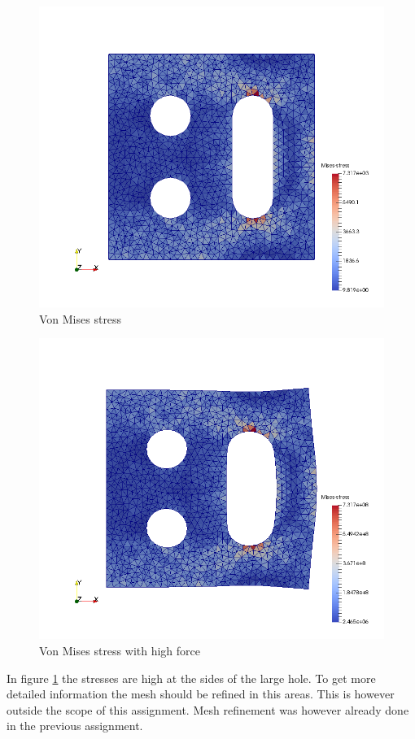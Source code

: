 \begin{figure}[H]
    \begin{center}
    \includegraphics[scale=0.5]{IMG/smile_mises.png}
    \caption{Von Mises stress}
    \label{VonMises}
    \end{center}
\end{figure}
\begin{figure}[H]
    \begin{center}
    \includegraphics[scale=0.5]{IMG/smile_mises2.png}
    \caption{Von Mises stress with high force}
    \label{VonMises2}
    \end{center}
\end{figure}
In figure \ref{VonMises} the stresses are high at the sides of the large hole. To get more detailed information the mesh should be refined in this areas. This is however outside the scope of this assignment. Mesh refinement was however already done in the previous assignment.